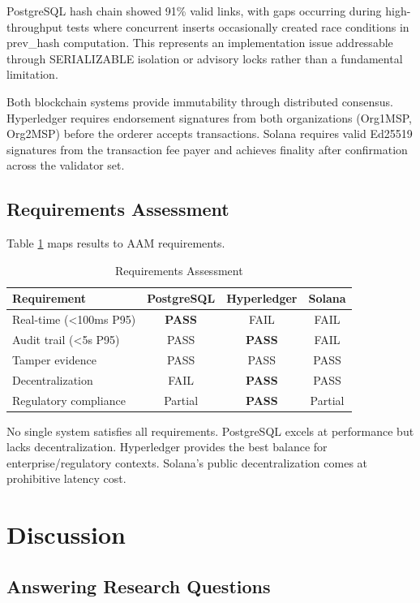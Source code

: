 \documentclass[conference]{IEEEtran}
\begin{document}
PostgreSQL hash chain showed 91\% valid links, with gaps occurring during high-throughput tests where concurrent inserts occasionally created race conditions in prev\_hash computation. This represents an implementation issue addressable through SERIALIZABLE isolation or advisory locks rather than a fundamental limitation.

Both blockchain systems provide immutability through distributed consensus. Hyperledger requires endorsement signatures from both organizations (Org1MSP, Org2MSP) before the orderer accepts transactions. Solana requires valid Ed25519 signatures from the transaction fee payer and achieves finality after confirmation across the validator set.

\subsection{Requirements Assessment}

Table \ref{tab:requirements} maps results to AAM requirements.

\begin{table}[htbp]
\caption{Requirements Assessment}
\label{tab:requirements}
\centering
\begin{tabular}{lccc}
\toprule
\textbf{Requirement} & \textbf{PostgreSQL} & \textbf{Hyperledger} & \textbf{Solana} \\
\midrule
Real-time (<100ms P95) & \textbf{PASS} & FAIL & FAIL \\
Audit trail (<5s P95) & PASS & \textbf{PASS} & FAIL \\
Tamper evidence & PASS & PASS & PASS \\
Decentralization & FAIL & \textbf{PASS} & PASS \\
Regulatory compliance & Partial & \textbf{PASS} & Partial \\
\bottomrule
\end{tabular}
\end{table}

No single system satisfies all requirements. PostgreSQL excels at performance but lacks decentralization. Hyperledger provides the best balance for enterprise/regulatory contexts. Solana's public decentralization comes at prohibitive latency cost.

\section{Discussion}
\label{sec:discussion}

\subsection{Answering Research Questions}
\end{document}

